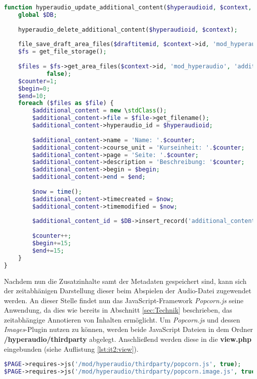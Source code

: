 \begin{lstlisting}[language=php,
             linewidth=\textwidth,
             caption={Ausschnitt der \textbf{locallib.php} in der 2. Iteration},
             label={lst:it2:locallib}]
function hyperaudio_update_additional_content($hyperaudioid, $context, $draftitemid, $configfile) {
	global $DB;
    
	hyperaudio_delete_additional_content($hyperaudioid, $context);
    
	file_save_draft_area_files($draftitemid, $context->id, 'mod_hyperaudio', 'additional_content', $hyperaudioid);
	$fs = get_file_storage();
    
	$files = $fs->get_area_files($context->id, 'mod_hyperaudio', 'additional_content', $hyperaudioid, 'itemid, filepath, filename',
            false);
	$counter=1;
	$begin=0;
	$end=10;
	foreach ($files as $file) {        
		$additional_content = new \stdClass();
		$additional_content->file = $file->get_filename();
		$additional_content->hyperaudio_id = $hyperaudioid;
        
		$additional_content->name = 'Name: '.$counter;
		$additional_content->course_unit = 'Kurseinheit: '.$counter;
		$additional_content->page = 'Seite: '.$counter;
		$additional_content->description = 'Beschreibung: '$counter;
		$additional_content->begin = $begin;
		$additional_content->end = $end;
        
		$now = time();
		$additional_content->timecreated = $now;
		$additional_content->timemodified = $now;
        
		$additional_content_id = $DB->insert_record('additional_content', $additional_content);
		
		$counter++;
		$begin+=15;
		$end+=15;
    }
}
\end{lstlisting}

Nachdem nun die Zusatzinhalte samt der Metadaten gespeichert sind, kann sich der zeitabhänigen Darstellung dieser beim Abspielen der Audio-Datei zugewendet werden. An dieser Stelle findet nun das JavaScript-Framework \textit{Popcorn.js} seine Anwendung, da dies wie bereits in Abschnitt \ref{sec:Technik} beschrieben, das zeitabhängige Annotieren von Inhalten ermöglicht. Um \textit{Popcorn.js} und dessen \textit{Images}-Plugin nutzen zu können, werden beide JavaScript Dateien in dem Ordner \textbf{/hyperaudio/thirdparty} abgelegt. Anschließend werden diese in die \textbf{view.php} eingebunden (siehe Auflistung \ref{lst:it2:view}).

\begin{lstlisting}[language=php,
             linewidth=\textwidth,
             caption={Ausschnitt der \textbf{view.php} in der 2. Iteration},
             label={lst:it2:view}]
$PAGE->requires->js('/mod/hyperaudio/thirdparty/popcorn.js', true);
$PAGE->requires->js('/mod/hyperaudio/thirdparty/popcorn.image.js', true);
\end{lstlisting}

